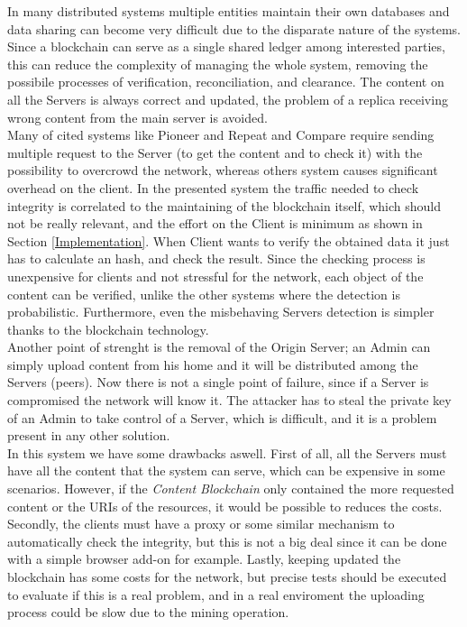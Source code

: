 \documentclass[conference,compsoc]{IEEEtran}
\begin{document}
In many distributed systems multiple entities maintain their own databases and data sharing can become very difficult due to the disparate nature of the systems. Since a blockchain can serve as a single shared ledger among interested parties, this can reduce the complexity of managing the whole system, removing the possibile processes of verification, reconciliation, and clearance. The content on all the Servers is always correct and updated, the problem of a replica receiving wrong content from the main server is avoided.\\
Many of cited systems like Pioneer \cite{seshadri2005pioneer} and Repeat and Compare \cite{michalakis2007ensuring} require sending multiple request to the Server (to get the content and to check it) with the possibility to overcrowd the network, whereas others system causes significant overhead on the client. In the presented system the traffic needed to check integrity is correlated to the maintaining of the blockchain itself, which should not be really relevant, and the effort on the Client is minimum as shown in Section \ref{Implementation}. When Client wants to verify the obtained data it just has to calculate an hash, and check the result. Since the checking process is unexpensive for clients and not stressful for the network, each object of the content can be verified, unlike the other systems where the detection is probabilistic. Furthermore, even the misbehaving Servers detection is simpler thanks to the blockchain technology. 
\\
Another point of strenght is the removal of the Origin Server; an Admin can simply upload content from his home and it will be distributed among the Servers (peers). Now there is not a single point of failure, since if a Server is compromised the network will know it.  The attacker has to steal the private key of an Admin to take control of a Server, which is difficult, and it is a problem present in any other solution.
\\In this system we have some drawbacks aswell. First of all, all the Servers must have all the content that the system can serve, which can be expensive in some scenarios. However, if the \textit{Content Blockchain} only contained the more requested content or the URIs of the resources, it would be possible to reduces the costs. Secondly, the clients must have a proxy or some similar mechanism to automatically check the integrity, but this is not a big deal since it can be done with a simple browser add-on for example. Lastly, keeping updated the blockchain has some costs for the network, but precise tests should be executed to evaluate if this is a real problem, and in a real enviroment the uploading process could be slow due to the mining operation.
\end{document}
